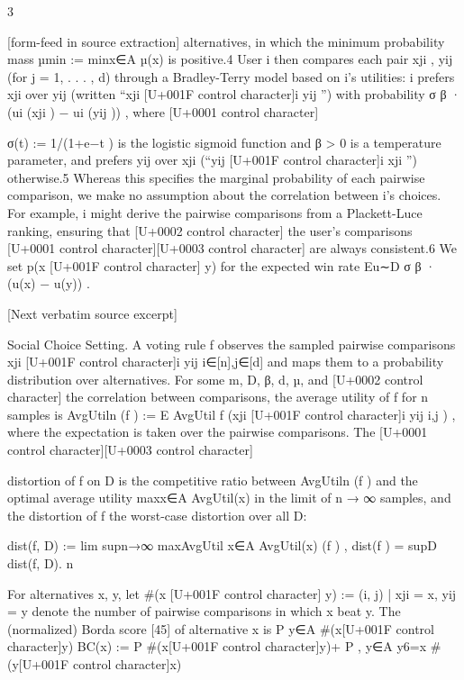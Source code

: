 \documentclass[10pt]{article}
\begin{document}
\begin{ReviewVerbatim}
                                                           3

[form-feed in source extraction]
alternatives, in which the minimum probability mass µmin := minx∈A µ(x) is positive.4 User i
then compares each pair {xji , yij } (for j = 1, . . . , d) through a Bradley-Terry model based on i’s
utilities: i prefers xji over yij (written “xji [U+001F control character]i yij ”) with probability σ β · (ui (xji ) − ui (yij )) , where
                                                                                                        [U+0001 control character]

σ(t) := 1/(1+e−t ) is the logistic sigmoid function and β > 0 is a temperature parameter, and prefers
yij over xji (“yij [U+001F control character]i xji ”) otherwise.5 Whereas this specifies the marginal probability of each pairwise
comparison, we make no assumption about the correlation between i’s choices. For example, i might
derive the pairwise comparisons from a Plackett-Luce ranking, ensuring that      [U+0002 control character] the user’s comparisons  [U+0001 control character][U+0003 control character]
are always consistent.6 We set p(x [U+001F control character] y) for the expected win rate Eu∼D σ β · (u(x) − u(y)) .

[Next verbatim source excerpt]

Social Choice Setting. A voting rule f observes the sampled pairwise comparisons {xji [U+001F control character]i
yij }i∈[n],j∈[d] and maps them to a probability distribution over alternatives. For some m, D, β, d, µ,
and
  [U+0002 control character] the correlation between comparisons,     the average utility of f for n samples is AvgUtiln (f ) :=
E AvgUtil f ({xji [U+001F control character]i yij }i,j ) , where the expectation is taken over the pairwise comparisons. The
                               [U+0001 control character][U+0003 control character]

distortion of f on D is the competitive ratio between AvgUtiln (f ) and the optimal average utility
maxx∈A AvgUtil(x) in the limit of n → ∞ samples, and the distortion of f the worst-case distortion
over all D:

            dist(f, D) := lim supn→∞ maxAvgUtil
                                        x∈A AvgUtil(x)
                                                (f )   ,               dist(f ) = supD dist(f, D).
                                                       n



For alternatives x, y, let #(x [U+001F control character] y) := {(i, j) | xji = x, yij = y} denote the number of pairwise
comparisons in which x beat y. The (normalized) Borda score [45] of alternative x is
                                                       P
                                                         y∈A #(x[U+001F control character]y)
                                   BC(x) := P         #(x[U+001F control character]y)+
                                                              P             ,
                                                  y∈A           y6=x #(y[U+001F control character]x)



\end{ReviewVerbatim}
\end{document}
